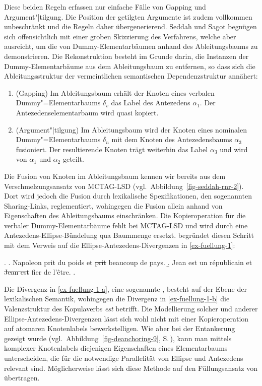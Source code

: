 Diese beiden Regeln erfassen nur einfache Fälle von Gapping und Argument"|tilgung. Die Position der getilgten Argumente ist zudem vollkommen unbeschränkt und die Regeln daher übergenerierend. Seddah und Sagot begnügen sich offensichtlich mit einer groben Skizzierung des Verfahrens, welche aber ausreicht, um die  von Dummy-Elementarbäumen anhand des Ableitungsbaums zu demonstrieren. Die Rekonstruktion besteht im Grunde darin, die Instanzen der Dummy-Elementarbäume aus dem Ableitungsbaum zu entfernen, so dass sich die Ableitungsstruktur der vermeintlichen semantischen Dependenzstruktur annähert:
\begin{enumerate}
  \item (Gapping) Im Ableitungsbaum erhält der Knoten eines verbalen Dummy"=Elementarbaums $\delta_v$ das Label des Antezedens $\alpha_1$. Der Antezedenselementarbaum wird quasi kopiert.
  \item (Argument"|tilgung) Im Ableitungsbaum wird der Knoten eines nominalen Dummy"=Elementarbaums $\delta_n$ mit dem Knoten des Antezedensbaums $\alpha_3$ fusioniert. Der resultierende Knoten trägt weiterhin das Label $\alpha_3$ und wird von $\alpha_1$ und $\alpha_2$ geteilt.
\end{enumerate}
Die Fusion von Knoten im Ableitungsbaum kennen wir bereits aus dem Verschmelzungsansatz von MCTAG-LSD (vgl.\ Abbildung~\ref{fig-seddah-rnr-2}). Dort wird jedoch die Fusion durch lexikalische Spezifikationen, den sogenannten Sharing-Links, reglementiert, wohingegen \cite{Seddah:Sagot:06} die Fusion allein anhand von Eigenschaften des Ableitungsbaums einschränken. Die Kopieroperation für die  verbaler Dummy-Elementarbäume fehlt bei MCTAG-LSD und wird durch eine Antezedens-Ellipse-Bündelung qua Baummenge ersetzt. \cite{Seddah:08} begründet diesen Schritt mit dem Verweis auf die Ellipse-Antezedens-Divergenzen in \ref{ex-fuellung-1}: 

\ex. \label{ex-fuellung-1}
\a. Napoleon prit du poids et \sout{prit} beaucoup de pays. \label{ex-fuellung-1-a}
\b. Jean est un r\'epublicain et \sout{Jean est} fier de l'\^{e}tre. \label{ex-fuellung-1-b} 
\z. \citep[Figure~1]{Seddah:08}

Die Divergenz in \ref{ex-fuellung-1-a}, eine sogenannte , besteht auf der Ebene der lexikalischen Semantik, wohingegen die Divergenz in \ref{ex-fuellung-1-b} die Valenzstruktur des Kopulaverbs {\it est} betrifft. Die Modellierung solcher und anderer Ellipse-Antezedens-Divergenzen lässt sich wohl nicht mit einer Kopieroperation auf atomaren Knotenlabels bewerkstelligen. Wie aber bei der Entankerung gezeigt wurde (vgl.\ Abbildung~\ref{fig-deanchoring-9}, S.\,\pageref{fig-deanchoring-9}), kann man mittels komplexer Knotenlabels diejenigen Eigenschaften eines Elementarbaums unterscheiden, die für die notwendige Parallelität von Ellipse und Antezedens relevant sind. Möglicherweise lässt sich diese Methode auf den Füllungsansatz von \cite{Seddah:Sagot:06} übertragen.

